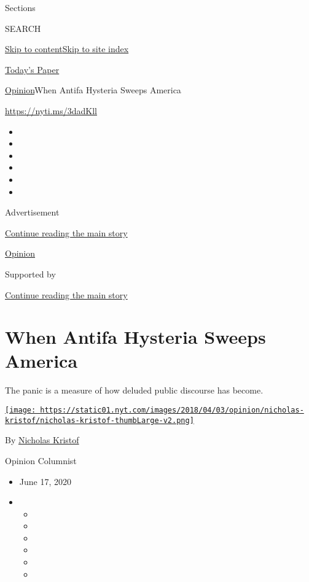 Sections

SEARCH

\protect\hyperlink{site-content}{Skip to
content}\protect\hyperlink{site-index}{Skip to site index}

\href{https://myaccount.nytimes.com/auth/login?response_type=cookie\&client_id=vi}{}

\href{https://www.nytimes.com/section/todayspaper}{Today's Paper}

\href{/section/opinion}{Opinion}\textbar{}When Antifa Hysteria Sweeps
America

\href{https://nyti.ms/3dadKll}{https://nyti.ms/3dadKll}

\begin{itemize}
\item
\item
\item
\item
\item
\item
\end{itemize}

Advertisement

\protect\hyperlink{after-top}{Continue reading the main story}

\href{/section/opinion}{Opinion}

Supported by

\protect\hyperlink{after-sponsor}{Continue reading the main story}

\hypertarget{when-antifa-hysteria-sweeps-america}{%
\section{When Antifa Hysteria Sweeps
America}\label{when-antifa-hysteria-sweeps-america}}

The panic is a measure of how deluded public discourse has become.

\href{https://www.nytimes.com/column/nicholas-kristof}{\texttt{[image: https://static01.nyt.com/images/2018/04/03/opinion/nicholas-kristof/nicholas-kristof-thumbLarge-v2.png]}}

By \href{https://www.nytimes.com/column/nicholas-kristof}{Nicholas
Kristof}

Opinion Columnist

\begin{itemize}
\item
  June 17, 2020
\item
  \begin{itemize}
  \item
  \item
  \item
  \item
  \item
  \item
  \end{itemize}
\end{itemize}

